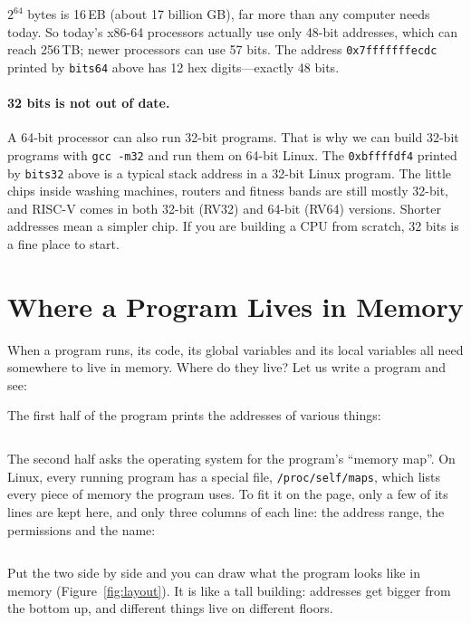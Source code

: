 $2^{64}$ bytes is 16\,EB (about 17 billion GB), far more than any computer needs today. So today's x86-64 processors actually use only 48-bit addresses, which can reach 256\,TB; newer processors can use 57 bits. The address \texttt{0x7fffffffecdc} printed by \texttt{bits64} above has 12 hex digits---exactly 48 bits.

\paragraph{32 bits is not out of date.}
A 64-bit processor can also run 32-bit programs. That is why we can build 32-bit programs with \texttt{gcc -m32} and run them on 64-bit Linux. The \texttt{0xbffffdf4} printed by \texttt{bits32} above is a typical stack address in a 32-bit Linux program. The little chips inside washing machines, routers and fitness bands are still mostly 32-bit, and RISC-V comes in both 32-bit (RV32) and 64-bit (RV64) versions. Shorter addresses mean a simpler chip. If you are building a CPU from scratch, 32 bits is a fine place to start.

\section{Where a Program Lives in Memory}
\label{sec:layout}

When a program runs, its code, its global variables and its local variables all need somewhere to live in memory. Where do they live? Let us write a program and see:


The first half of the program prints the addresses of various things:
\inputminted[linenos=false]{text}{code/en/ch04/out/layout.txt}

The second half asks the operating system for the program's ``memory map''. On Linux, every running program has a special file, \texttt{/proc/self/maps}, which lists every piece of memory the program uses. To fit it on the page, only a few of its lines are kept here, and only three columns of each line: the address range, the permissions and the name:
\inputminted[linenos=false]{text}{code/en/ch04/out/layout_maps.txt}

Put the two side by side and you can draw what the program looks like in memory (Figure~\ref{fig:layout}). It is like a tall building: addresses get bigger from the bottom up, and different things live on different floors.

